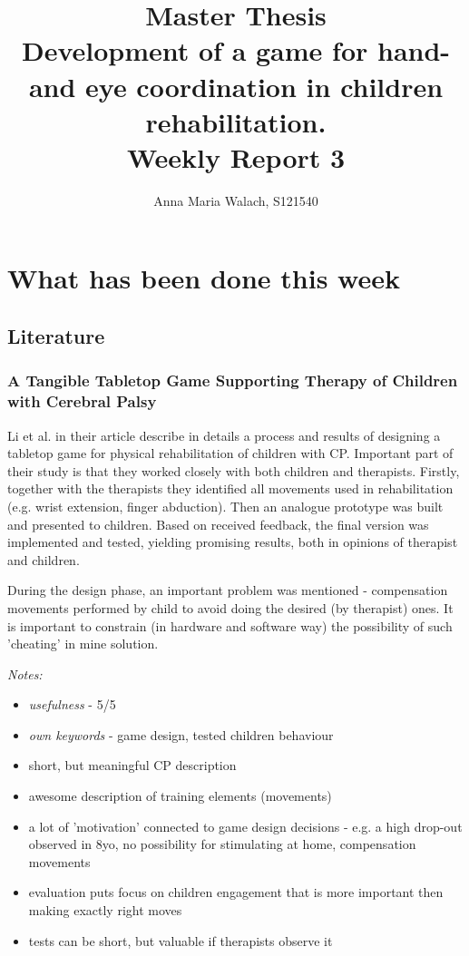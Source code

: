 \documentclass[10pt,a4paper]{article}
\title{{Master Thesis\\[0.5em]}
       {\bf \huge Development of a game for hand- and eye coordination in children rehabilitation.\\[0.5em]}
       {\bf Weekly Report 3}}
\author{Anna Maria Walach, S121540}
\begin{document}
\maketitle

\section*{What has been done this week}
\subsection*{Literature}
\subsubsection*{A Tangible Tabletop Game Supporting Therapy of Children with Cerebral Palsy }

Li et al. in their article \cite{tabletop} describe in details a process and results of designing a tabletop game for physical rehabilitation of children with CP. Important part of their study is that they worked closely with both children and therapists. Firstly, together with the therapists they identified all movements used in rehabilitation (e.g. wrist extension, finger abduction). Then an analogue prototype was built and presented to children. Based on received feedback, the final version was implemented and tested, yielding promising results, both in opinions of therapist and children. 

During the design phase, an important problem was mentioned - compensation movements performed by child to avoid doing the desired (by therapist) ones. It is important to constrain (in hardware and software way) the possibility of such 'cheating' in mine solution. 

\emph{Notes:}
\begin{itemize}
\item \emph{usefulness} - 5/5
\item \emph{own keywords} - game design, tested children behaviour
\item short, but meaningful CP description
\item awesome description of training elements (movements)
\item a lot of 'motivation' connected to game design decisions - e.g. a high drop-out observed in 8yo, no possibility for stimulating at home, compensation movements
\item evaluation puts focus on children engagement that is more important then making exactly right moves
\item tests can be short, but valuable if therapists observe it
\end{itemize}
\end{document}
